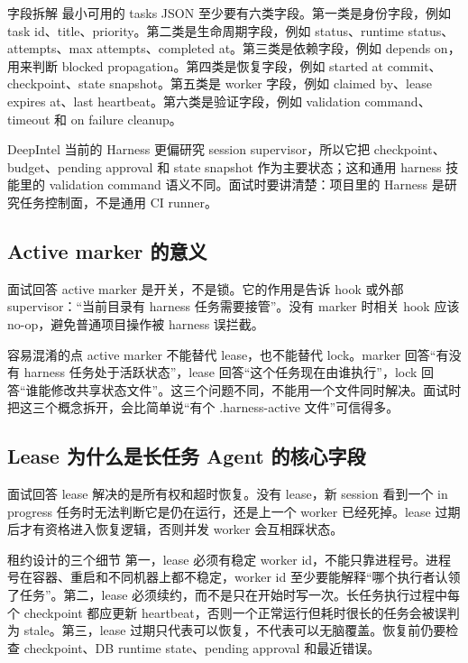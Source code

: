 \begin{analysisBox}{字段拆解}
最小可用的 tasks JSON 至少要有六类字段。第一类是身份字段，例如 task id、title、priority。第二类是生命周期字段，例如 status、runtime status、attempts、max attempts、completed at。第三类是依赖字段，例如 depends on，用来判断 blocked propagation。第四类是恢复字段，例如 started at commit、checkpoint、state snapshot。第五类是 worker 字段，例如 claimed by、lease expires at、last heartbeat。第六类是验证字段，例如 validation command、timeout 和 on failure cleanup。

DeepIntel 当前的 Harness 更偏研究 session supervisor，所以它把 checkpoint、budget、pending approval 和 state snapshot 作为主要状态；这和通用 harness 技能里的 validation command 语义不同。面试时要讲清楚：项目里的 Harness 是研究任务控制面，不是通用 CI runner。
\end{analysisBox}

\subsection{Active marker 的意义}
\begin{qaBox}{面试回答}
active marker 是开关，不是锁。它的作用是告诉 hook 或外部 supervisor：“当前目录有 harness 任务需要接管”。没有 marker 时相关 hook 应该 no-op，避免普通项目操作被 harness 误拦截。
\end{qaBox}

\begin{analysisBox}{容易混淆的点}
active marker 不能替代 lease，也不能替代 lock。marker 回答“有没有 harness 任务处于活跃状态”，lease 回答“这个任务现在由谁执行”，lock 回答“谁能修改共享状态文件”。这三个问题不同，不能用一个文件同时解决。面试时把这三个概念拆开，会比简单说“有个 .harness-active 文件”可信得多。
\end{analysisBox}

\subsection{Lease 为什么是长任务 Agent 的核心字段}
\begin{qaBox}{面试回答}
lease 解决的是所有权和超时恢复。没有 lease，新 session 看到一个 in progress 任务时无法判断它是仍在运行，还是上一个 worker 已经死掉。lease 过期后才有资格进入恢复逻辑，否则并发 worker 会互相踩状态。
\end{qaBox}

\begin{analysisBox}{租约设计的三个细节}
第一，lease 必须有稳定 worker id，不能只靠进程号。进程号在容器、重启和不同机器上都不稳定，worker id 至少要能解释“哪个执行者认领了任务”。第二，lease 必须续约，而不是只在开始时写一次。长任务执行过程中每个 checkpoint 都应更新 heartbeat，否则一个正常运行但耗时很长的任务会被误判为 stale。第三，lease 过期只代表可以恢复，不代表可以无脑覆盖。恢复前仍要检查 checkpoint、DB runtime state、pending approval 和最近错误。
\end{analysisBox}

